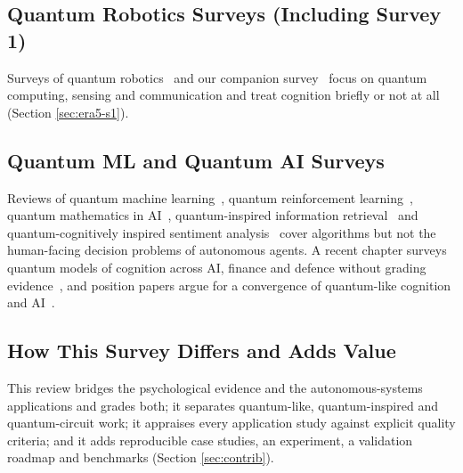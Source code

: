 \documentclass[pdflatex,sn-basic]{sn-jnl}
\begin{document}
\subsection{Quantum Robotics Surveys (Including Survey 1)}
Surveys of quantum robotics~\citep{Yan2024,Petschnigg2019} and our companion survey~\citep{Guru2026} focus on quantum computing, sensing and communication and treat cognition briefly or not at all (Section \ref{sec:era5-s1}).

\subsection{Quantum ML and Quantum AI Surveys}
Reviews of quantum machine learning~\citep{Biamonte2017,Dunjko2018}, quantum reinforcement learning~\citep{Meyer2022,Chen2024}, quantum mathematics in AI~\citep{Widdows2021}, quantum-inspired information retrieval~\citep{Uprety2021} and quantum-cognitively inspired sentiment analysis~\citep{Liu2023} cover algorithms but not the human-facing decision problems of autonomous agents. A recent chapter surveys quantum models of cognition across AI, finance and defence without grading evidence~\citep{Maksymov2026}, and position papers argue for a convergence of quantum-like cognition and AI~\citep{Khrennikov2022,Khrennikov2026}.

\subsection{How This Survey Differs and Adds Value}
This review bridges the psychological evidence and the autonomous-systems applications and grades both; it separates quantum-like, quantum-inspired and quantum-circuit work; it appraises every application study against explicit quality criteria; and it adds reproducible case studies, an experiment, a validation roadmap and benchmarks (Section \ref{sec:contrib}).
\end{document}
